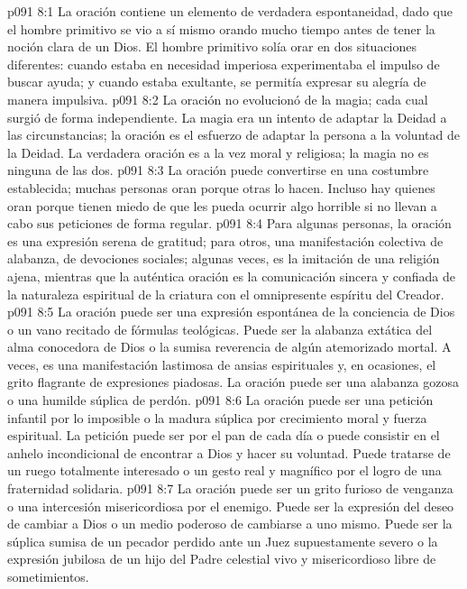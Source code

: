 \vs p091 8:1 La oración contiene un elemento de verdadera espontaneidad, dado que el hombre primitivo se vio a sí mismo orando mucho tiempo antes de tener la noción clara de un Dios. El hombre primitivo solía orar en dos situaciones diferentes: cuando estaba en necesidad imperiosa experimentaba el impulso de buscar ayuda; y cuando estaba exultante, se permitía expresar su alegría de manera impulsiva.
\vs p091 8:2 \pc La oración no evolucionó de la magia; cada cual surgió de forma independiente. La magia era un intento de adaptar la Deidad a las circunstancias; la oración es el esfuerzo de adaptar la persona a la voluntad de la Deidad. La verdadera oración es a la vez moral y religiosa; la magia no es ninguna de las dos.
\vs p091 8:3 \pc La oración puede convertirse en una costumbre establecida; muchas personas oran porque otras lo hacen. Incluso hay quienes oran porque tienen miedo de que les pueda ocurrir algo horrible si no llevan a cabo sus peticiones de forma regular.
\vs p091 8:4 Para algunas personas, la oración es una expresión serena de gratitud; para otros, una manifestación colectiva de alabanza, de devociones sociales; algunas veces, es la imitación de una religión ajena, mientras que la auténtica oración es la comunicación sincera y confiada de la naturaleza espiritual de la criatura con el omnipresente espíritu del Creador.
\vs p091 8:5 La oración puede ser una expresión espontánea de la conciencia de Dios o un vano recitado de fórmulas teológicas. Puede ser la alabanza extática del alma conocedora de Dios o la sumisa reverencia de algún atemorizado mortal. A veces, es una manifestación lastimosa de ansias espirituales y, en ocasiones, el grito flagrante de expresiones piadosas. La oración puede ser una alabanza gozosa o una humilde súplica de perdón.
\vs p091 8:6 La oración puede ser una petición infantil por lo imposible o la madura súplica por crecimiento moral y fuerza espiritual. La petición puede ser por el pan de cada día o puede consistir en el anhelo incondicional de encontrar a Dios y hacer su voluntad. Puede tratarse de un ruego totalmente interesado o un gesto real y magnífico por el logro de una fraternidad solidaria.
\vs p091 8:7 La oración puede ser un grito furioso de venganza o una intercesión misericordiosa por el enemigo. Puede ser la expresión del deseo de cambiar a Dios o un medio poderoso de cambiarse a uno mismo. Puede ser la súplica sumisa de un pecador perdido ante un Juez supuestamente severo o la expresión jubilosa de un hijo del Padre celestial vivo y misericordioso libre de sometimientos.
